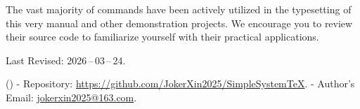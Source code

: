 The vast majority of \SimpleSystemTeX commands have been actively utilized in the typesetting of this very manual and other demonstration projects. We encourage you to review their source code to familiarize yourself with their practical applications.

Last Revised: 2026\,--\,03\,--\,24.

\bigskip\bigskip\bigskip

(){
    - \SimpleSystemTeX Repository: \href{https://github.com/JokerXin2025/SimpleSystemTeX}{https://github.com/JokerXin2025/SimpleSystemTeX}.
    - Author's Email: \href{mailto:jokerxin2025@163.com}{jokerxin2025@163.com}.
}

\newpage
